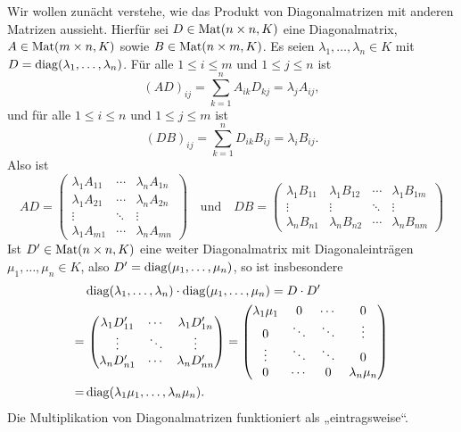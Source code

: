 Wir wollen zunächt verstehe, wie das Produkt von Diagonalmatrizen mit anderen Matrizen aussieht. Hierfür sei $D \in \mathrm{Mat}(n \times n, K)$ eine Diagonalmatrix, $A \in \mathrm{Mat}(m \times n, K)$ sowie $B \in \mathrm{Mat}(n \times m, K)$. Es seien $\lambda_1, \dotsc, \lambda_n \in K$ mit $D = \mathrm{diag}(\lambda_1, \dotsc, \lambda_n)$. Für alle $1 \leq i \leq m$ und $1 \leq j \leq n$ ist
\[
 (AD)_{ij}
 = \sum_{k=1}^n A_{ik} D_{kj}
 = \lambda_j A_{ij},
\]
und für alle $1 \leq i \leq n$ und $1 \leq j \leq m$ ist
\[
 (DB)_{ij}
 = \sum_{k=1}^n D_{ik} B_{ij}
 = \lambda_i B_{ij}.
\]
Also ist
\[
 AD =
 \begin{pmatrix}
  \lambda_1 A_{11} & \cdots & \lambda_n A_{1n} \\
  \lambda_1 A_{21} & \cdots & \lambda_n A_{2n} \\
  \vdots           & \ddots & \vdots           \\
  \lambda_1 A_{m1} & \cdots & \lambda_n A_{mn} 
 \end{pmatrix}
 \quad\text{und}\quad
 DB =
 \begin{pmatrix}
  \lambda_1 B_{11} & \lambda_1 B_{12} & \cdots & \lambda_1 B_{1m} \\
  \vdots           & \vdots           & \ddots & \vdots \\
  \lambda_n B_{n1} & \lambda_n B_{n2} & \cdots & \lambda_n B_{nm}
 \end{pmatrix}
\]
Ist $D' \in \mathrm{Mat}(n \times n, K)$ eine weiter Diagonalmatrix mit Diagonaleinträgen $\mu_1, \dotsc, \mu_n \in K$, also $D' = \mathrm{diag}(\mu_1, \dotsc, \mu_n)$, so ist insbesondere
\begin{align*}
  &\, \mathrm{diag}(\lambda_1, \dotsc, \lambda_n) \cdot \mathrm{diag}(\mu_1, \dotsc, \mu_n)
 = D \cdot D' \\
 =&\,
 \begin{pmatrix}
  \lambda_1 D'_{11} & \cdots & \lambda_1 D'_{1n} \\
  \vdots            & \ddots & \vdots           \\
  \lambda_n D'_{n1} & \cdots & \lambda_n D'_{nn}
 \end{pmatrix}
 =
 \begin{pmatrix}
  \lambda_1 \mu_1 & 0      & \cdots & 0      \\
  0               & \ddots & \ddots & \vdots \\
  \vdots          & \ddots & \ddots & 0      \\
  0               & \cdots & 0      & \lambda_n \mu_n
 \end{pmatrix} \\
 =&\, \mathrm{diag}(\lambda_1 \mu_1, \dotsc, \lambda_n \mu_n).
\end{align*}
Die Multiplikation von Diagonalmatrizen funktioniert als „eintragsweise“.

